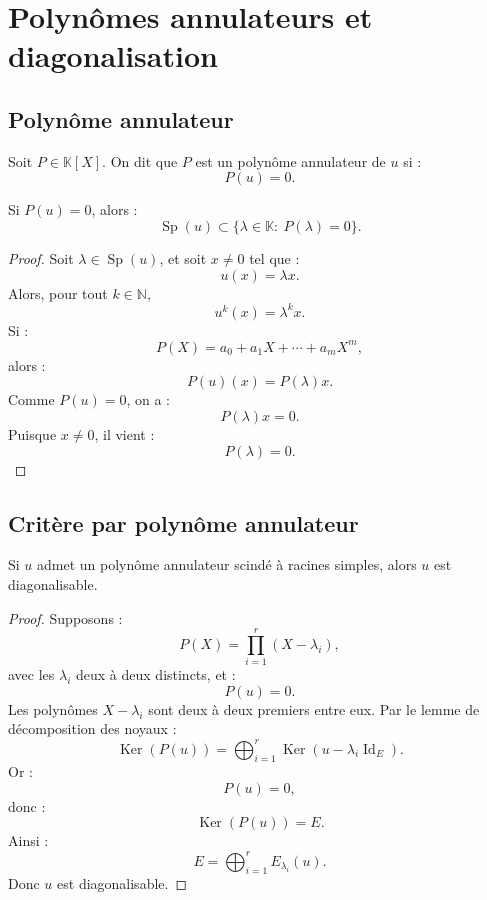 \documentclass[11pt,a4paper]{article}
\newcommand{\K}{\mathbb K}
\newcommand{\N}{\mathbb N}
\newcommand{\Ker}{\operatorname{Ker}}
\newcommand{\Id}{\operatorname{Id}}
\newcommand{\Sp}{\operatorname{Sp}}
\begin{document}
\section{Polynômes annulateurs et diagonalisation}

\subsection{Polynôme annulateur}

\begin{definitionbox}
Soit \(P\in\K[X]\).  
On dit que \(P\) est un polynôme annulateur de \(u\) si :
\[
P(u)=0.
\]
\end{definitionbox}

\begin{theorembox}
Si \(P(u)=0\), alors :
\[
\Sp(u)\subset\{\lambda\in\K:\ P(\lambda)=0\}.
\]
\end{theorembox}

\begin{proof}
Soit \(\lambda\in\Sp(u)\), et soit \(x\neq0\) tel que :
\[
u(x)=\lambda x.
\]
Alors, pour tout \(k\in\N\),
\[
u^k(x)=\lambda^kx.
\]
Si :
\[
P(X)=a_0+a_1X+\cdots+a_mX^m,
\]
alors :
\[
P(u)(x)=P(\lambda)x.
\]
Comme \(P(u)=0\), on a :
\[
P(\lambda)x=0.
\]
Puisque \(x\neq0\), il vient :
\[
P(\lambda)=0.
\]
\end{proof}

\subsection{Critère par polynôme annulateur}

\begin{theorembox}
Si \(u\) admet un polynôme annulateur scindé à racines simples, alors \(u\) est diagonalisable.
\end{theorembox}

\begin{proof}
Supposons :
\[
P(X)=\prod_{i=1}^r(X-\lambda_i),
\]
avec les \(\lambda_i\) deux à deux distincts, et :
\[
P(u)=0.
\]
Les polynômes \(X-\lambda_i\) sont deux à deux premiers entre eux.  
Par le lemme de décomposition des noyaux :
\[
\Ker(P(u))
=
\bigoplus_{i=1}^r \Ker(u-\lambda_i\Id_E).
\]
Or :
\[
P(u)=0,
\]
donc :
\[
\Ker(P(u))=E.
\]
Ainsi :
\[
E=
\bigoplus_{i=1}^r E_{\lambda_i}(u).
\]
Donc \(u\) est diagonalisable.
\end{proof}
\end{document}
